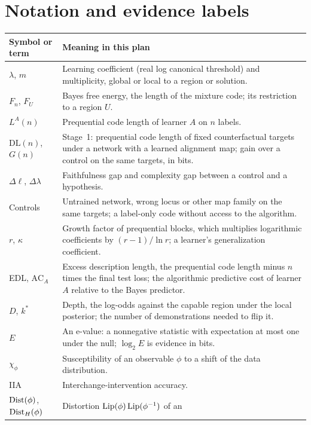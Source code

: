 \documentclass[11pt,a4paper]{article}
\newcommand{\DL}{\mathrm{DL}}
\begin{document}
\section{Notation and evidence labels}

\begin{longtable}{@{}P{3.2cm}P{11.7cm}@{}}
\toprule
Symbol or term & Meaning in this plan \\
\midrule
\endhead
$\lambda$, $m$ & Learning coefficient (real log canonical threshold) and
multiplicity, global or local to a region or solution. \\ \addlinespace
$F_n$, $F_U$ & Bayes free energy, the length of the mixture code; its
restriction to a region $U$. \\ \addlinespace
$L^A(n)$ & Prequential code length of learner $A$ on $n$ labels. \\ \addlinespace
$\DL(n)$, $G(n)$ & Stage~1: prequential code length of fixed counterfactual targets under a network with a learned alignment map; gain over a control on the same targets, in bits. \\ \addlinespace
$\Delta\ell$, $\Delta\lambda$ & Faithfulness gap and complexity gap
between a control and a hypothesis. \\ \addlinespace
Controls & Untrained network, wrong locus or other map family on the same targets; a label-only code without access to the algorithm. \\ \addlinespace
$r$, $\kappa$ & Growth factor of prequential blocks, which multiplies logarithmic coefficients by $(r-1)/\ln r$; a learner's generalization coefficient. \\ \addlinespace
EDL, $\mathrm{AC}_A$ & Excess description length, the prequential code length minus $n$ times the final test loss; the algorithmic predictive cost of learner $A$ relative to the Bayes predictor. \\ \addlinespace
$D$, $k^*$ & Depth, the log-odds against the capable region under the local posterior; the number of demonstrations needed to flip it. \\ \addlinespace
$E$ & An e-value: a nonnegative statistic with expectation at most one under
the null; $\log_2E$ is evidence in bits. \\ \addlinespace
$\chi_\phi$ & Susceptibility of an observable $\phi$ to a shift of the data distribution. \\ \addlinespace
IIA & Interchange-intervention accuracy. \\ \addlinespace
$\operatorname{Dist}(\phi)$, $\operatorname{Dist}_H(\phi)$ & Distortion $\operatorname{Lip}(\phi)\operatorname{Lip}(\phi^{-1})$ of an

\end{longtable}
\end{document}
